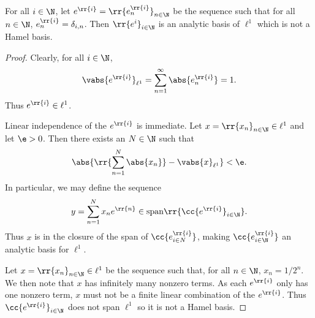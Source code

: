 \documentclass{article}
\begin{document}
\begin{claim*}[8]
  For all $i\in\N$, let $e^{\rr{i}}=\rr{e^{\rr{i}}_n}_{n\in\N}$ be the sequence such that
  for all $n\in\N$, $e_n^{\rr{i}}=\delta_{i,n}$. Then $\rr{e^{i}}_{i\in\N}$ is an analytic basis
  of $\ell^1$ which is not a Hamel basis.
  \begin{proof}
    Clearly, for all $i\in\N$,
    \begin{align*}
      \vabs{e^{\rr{i}}}_{\ell^1} = \sum_{n=1}^{\infty} \abs{e^{\rr{i}}_n} = 1.
    \end{align*}
    Thus $e^{\rr{i}}\in \ell^1$.

    Linear independence of the $e^{\rr{i}}$ is immediate. Let $x=\rr{x_n}_{n\in\N}\in\ell^1$ and let
    $\e>0$. Then there exists an $N\in\N$ such that
    \begin{align*}
      \abs{\rr{\sum_{n=1}^{N} \abs{x_n}} - \vabs{x}_{\ell^1}} < \e.
    \end{align*}
    In particular, we may define the sequence
    \begin{align*}
      y= \sum_{n=1}^{N} x_n e^{\rr{n}} \in\text{span}\rr{\cc{e^{\rr{i}}}_{i\in\N}}.
    \end{align*}
    Thus $x$ is in the closure of the span of $\cc{e^{\rr{i}}_{i\in N}}$, making $\cc{e^{\rr{i}}_{i\in\N}}$
    an analytic basis for $\ell^1$.

    Let $x=\rr{x_n}_{n\in\N}\in\ell^1$ be the sequence such that, for all $n\in\N$, $x_n=1/2^n$.
    We then note that $x$ has infinitely many nonzero terms. As each $e^{\rr{i}}$ only has
    one nonzero term, $x$ must not be a finite linear combination of the $e^{\rr{i}}$. Thus
    $\cc{e^{\rr{i}}}_{i\in\N}$ does not span $\ell^1$ so it is not a Hamel basis.
  \end{proof}
\end{claim*}
\end{document}
